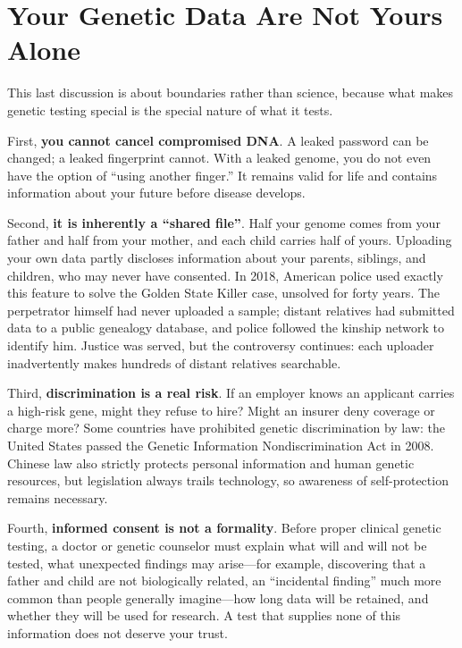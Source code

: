 \section{Your Genetic Data Are Not Yours Alone}

This last discussion is about boundaries rather than science, because what makes genetic testing special is the special nature of what it tests.

First, \textbf{you cannot cancel compromised DNA}. A leaked password can be changed; a leaked fingerprint cannot. With a leaked genome, you do not even have the option of ``using another finger.'' It remains valid for life and contains information about your future before disease develops.

Second, \textbf{it is inherently a ``shared file''}. Half your genome comes from your father and half from your mother, and each child carries half of yours. Uploading your own data partly discloses information about your parents, siblings, and children, who may never have consented. In 2018, American police used exactly this feature to solve the Golden State Killer case, unsolved for forty years. The perpetrator himself had never uploaded a sample; distant relatives had submitted data to a public genealogy database, and police followed the kinship network to identify him. Justice was served, but the controversy continues: each uploader inadvertently makes hundreds of distant relatives searchable.

Third, \textbf{discrimination is a real risk}. If an employer knows an applicant carries a high-risk gene, might they refuse to hire? Might an insurer deny coverage or charge more? Some countries have prohibited genetic discrimination by law: the United States passed the Genetic Information Nondiscrimination Act in 2008. Chinese law also strictly protects personal information and human genetic resources, but legislation always trails technology, so awareness of self-protection remains necessary.

Fourth, \textbf{informed consent is not a formality}. Before proper clinical genetic testing, a doctor or genetic counselor must explain what will and will not be tested, what unexpected findings may arise---for example, discovering that a father and child are not biologically related, an ``incidental finding'' much more common than people generally imagine---how long data will be retained, and whether they will be used for research. A test that supplies none of this information does not deserve your trust.

